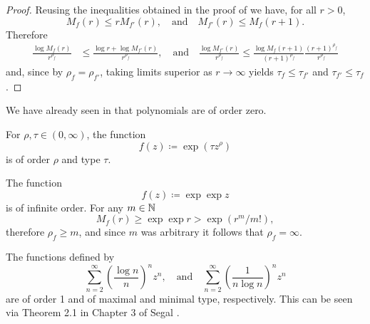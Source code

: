 \begin{proof}
    Reusing the inequalities obtained in the proof of  we have, for all $r > 0$,
    \begin{equation*}
        M_f(r) \leq r M_{f'}(r), \quad \textrm{and} \quad M_{f'}(r) \leq M_f(r+1).
    \end{equation*}
    Therefore
    \begin{align*}
        \frac{\log M_f(r)}{r^{\rho_f}} &\leq \frac{\log r + \log M_{f'}(r)}{r^{\rho_f}}, \quad \textrm{and} \quad \frac{\log M_{f'}(r)}{r^{\rho_f}} \leq \frac{\log M_{f}(r+1)}{(r+1)^{\rho_f}} \frac{(r+1)^{\rho_f}}{r^{\rho_f}}
    \end{align*}
    and, since by  $\rho_f = \rho_{f'}$, taking limits superior as $r \to \infty$ yields $\tau_f \leq \tau_{f'}$ and $\tau_{f'} \leq \tau_f$.
\end{proof}

\begin{example} \label{exm:order-and-type}
    \leavevmode
    \begin{arrowlist}
        \item We have already seen in  that polynomials are of order zero.
        \item For $\rho, \tau \in (0, \infty)$, the function
        $$ f(z) \coloneqq \exp ({\tau z^\rho}) $$
        is of order $\rho$ and type $\tau$.
        \item The function
        $$ f(z) \coloneqq \exp \exp z $$
        is of infinite order. For any $m \in \mathbb{N}$
        $$ M_f(r) \geq \exp \exp r > \exp (r^m / m!), $$
        therefore $\rho_f \geq m$, and since $m$ was arbitrary it follows that $\rho_f = \infty$.
        \item The functions defined by
        $$ \sum_{n=2}^\infty \left( \frac{\log n}{n} \right)^n z^n, \quad \textrm{and} \quad \sum_{n=2}^\infty \left( \frac{1}{n \log n} \right)^n z^n $$
        are of order 1 and of maximal and minimal type, respectively. This can be seen via Theorem 2.1 in Chapter 3 of Segal \cite{segal-complex-analysis}.
        \qedhere
    \end{arrowlist}
\end{example}